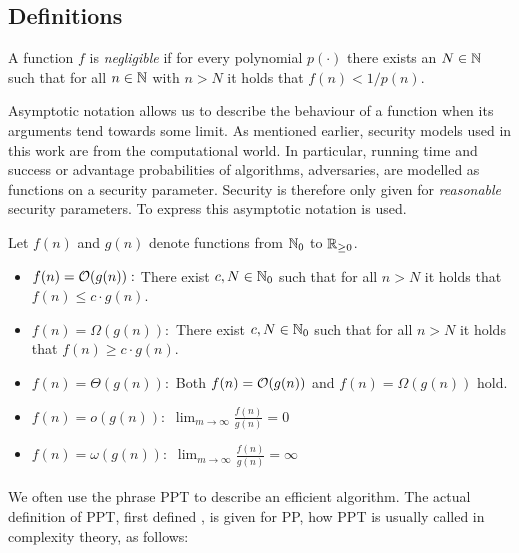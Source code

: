 \subsection{Definitions}

\begin{definition}\label{def:negligible}
A function $f$ is \emph{negligible} if for every polynomial $p(\cdot)$ there exists an $N\in\mathbb{N}$ such that for all $n\in\mathbb{N}$ with $n>N$ it holds that $f(n)<1/p(n)$.
\eod
\end{definition}

\noindent
Asymptotic notation allows us to describe the behaviour of a function when its arguments tend towards some limit.
As mentioned earlier, security models used in this work are from the computational world.
In particular, running time and success or advantage probabilities of algorithms, \ie adversaries, are modelled as functions on a security parameter.
Security is therefore only given for \emph{reasonable} security parameters.
To express this asymptotic notation is used.

\begin{definition}\label{def:asymptotic}
Let $f(n)$ and $g(n)$ denote functions from $\mathbb{N}_0$ to $\mathbb{R}_{\geq 0}$.
\begin{itemize}
	\item $f(n)=\mathcal{O}(g(n)):$ There exist $c,N\in\mathbb{N}_0$ such that for all $n>N$ it holds that $f(n)\leq c\cdot g(n)$.
	\item $f(n)=\Omega(g(n)):$ There exist $c,N\in\mathbb{N}_0$ such that for all $n>N$ it holds that $f(n)\geq c\cdot g(n)$.
	\item $f(n)=\Theta(g(n)):$ Both $f(n)=\mathcal{O}(g(n))$ and $f(n)=\Omega(g(n))$ hold.
	\item $f(n)=o(g(n)):$ $\lim_{m\rightarrow\infty}\frac{f(n)}{g(n)}=0$
	\item $f(n)=\omega(g(n)):$ $\lim_{m\rightarrow\infty}\frac{f(n)}{g(n)}=\infty$
\end{itemize}
\eod
\end{definition}

\paragraph{}
We often use the phrase \ac{PPT} to describe an efficient algorithm.
The actual definition of \ac{PPT}, first defined \cite{gill1977}, is given for \ac{PP}, how \ac{PPT} is usually called in complexity theory, as follows:

